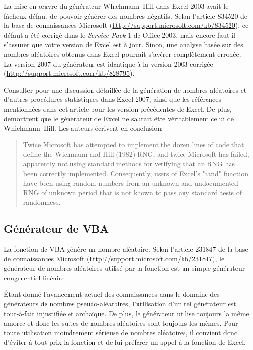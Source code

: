 \begin{sloppypar}
  La mise en {\oe}uvre du générateur Whichmann--Hill dans Excel 2003
  avait le fâcheux défaut de pouvoir générer des nombres négatifs.
  Selon l'article 834520 de la base de connaissances Microsoft
  (\url{http://support.microsoft.com/kb/834520}), ce défaut a été
  corrigé dans le \emph{Service Pack} 1 de Office 2003, mais encore
  faut-il s'assurer que votre version de Excel est à jour. Sinon, une
  analyse basée sur des nombres aléatoires obtenus dans Excel pourrait
  s'avérer complètement erronée. La version 2007 du générateur est
  identique à la version 2003 corrigée
  (\url{http://support.microsoft.com/kb/828795}).
\end{sloppypar}

Consulter \cite{McCullough:Excel2007:2008} pour une discussion
détaillée de la génération de nombres aléatoires et d'autres
procédures statistiques dans Excel 2007, ainsi que les références
mentionnées dans cet article pour les version précédentes de Excel. De
plus, \citet{McCullough:MENTWH:2008} démontrent que le générateur de
Excel ne saurait être véritablement celui de Whichmann--Hill. Les
auteurs écrivent en conclusion:

\begin{quote}
  Twice Microsoft has attempted to implement the dozen lines of code
  that define the Wichmann and Hill (1982) RNG, and twice Microsoft
  has failed, apparently not using standard methods for verifying that
  an RNG has been correctly implemented. Consequently, users of
  Excel's "rand" function have been using random numbers from an
  unknown and undocumented RNG of unknown period that is not known to
  pass any standard tests of randomness.
\end{quote}


\subsection{Générateur de VBA}

\begin{sloppypar}
  La fonction  de VBA génère un nombre aléatoire. Selon
  l'article 231847 de la base de connaissances Microsoft
  (\url{http://support.microsoft.com/kb/231847}),
  le générateur de nombres aléatoires utilisé par la fonction
   est un simple générateur congruentiel linéaire.
\end{sloppypar}

Étant donné l'avancement actuel des connaissances dans le domaine des
générateurs de nombres pseudo-aléatoires, l'utilisation d'un tel
générateur est tout-à-fait injustifiée et archaïque. De plus, le
générateur utilise toujours la même amorce et donc les suites de
nombres aléatoires sont toujours les mêmes. Pour toute
utilisation moindrement sérieuse de nombres aléatoires, il convient
donc d'éviter à tout prix la fonction  et de lui
préférer un appel à la fonction  de Excel.


